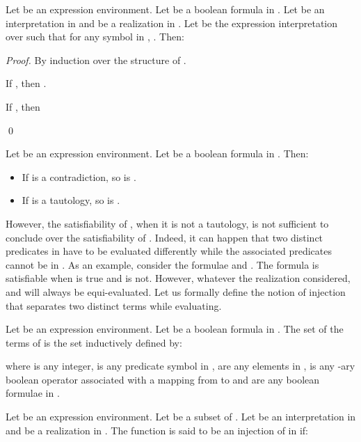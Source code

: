 \documentclass[a4paper]{llncs}
\begin{document}
   \begin{proposition}\label{prop si tphi contra phi aussi}
    Let  be an expression environment. Let  be a boolean formula in . Let  be an interpretation in  and  be a realization in . Let  be the expression interpretation over  such that for any symbol  in , .
    Then:
        
  \end{proposition}
  \begin{proof}
    By induction over the structure of .
    
    If , then .
    
    If , then 
        
    \qed
  \end{proof}
  
  \begin{corollary}\label{cor tphi contra phi aussi}
    Let  be an expression environment. Let  be a boolean formula in . Then:
    \begin{itemize}
      \item If  is a contradiction, so is .
      \item If  is a tautology, so is .
    \end{itemize}
  \end{corollary}
  
  However, the satisfiability of , when it is not a tautology, is not sufficient to conclude over the satisfiability of . 
  Indeed, 
  it can happen that two distinct predicates in  have to be evaluated differently while the associated predicates cannot be in . 
  As an example, consider the formulae  and . The formula  is satisfiable when  is true and   is not. However, whatever the realization considered,  and  will always be equi-evaluated. Let us formally define the notion of injection that separates two distinct terms while evaluating.  
    
  Let  be an expression environment. Let  be a boolean formula in . The set of the terms of  is the set  inductively defined by:
        
        where  is any integer,  is any predicate symbol in ,  are any  elements in ,  is any -ary boolean operator associated with a mapping  from  to  and  are any  boolean formulae in .
    
  \begin{definition}[Injection]
    Let  be an expression environment. Let  be a subset of . Let  be an interpretation in  and  be a realization in . The function  is said to be an injection of  in  if:
        
  \end{definition}
  
\end{document}
